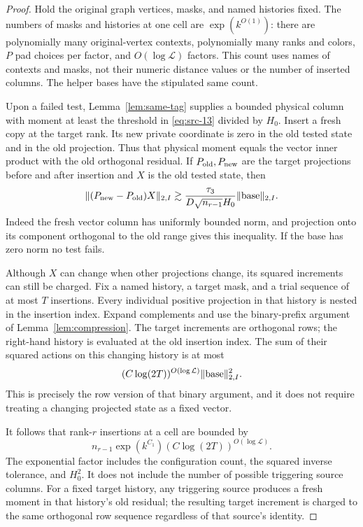 \begin{proof}
Hold the original graph vertices, masks, and named histories fixed.
The numbers of masks and histories at one cell are
$\exp(k^{O(1)})$: there are polynomially many original-vertex contexts,
polynomially many ranks and colors, $P$ pad choices per factor, and
$O(\log\mathcal L)$ factors.  This count uses names of contexts and
masks, not their numeric distance values or the number of inserted
columns.  The helper bases have the stipulated same count.

Upon a failed test, Lemma~\ref{lem:same-tag} supplies a bounded physical
column with moment at least the threshold in \eqref{eq:src-13} divided
by $H_0$.  Insert a fresh copy at the target rank.  Its new private
coordinate is zero in the old tested state and in the old projection.
Thus that physical moment equals the vector inner product with the old
orthogonal residual.  If $P_{\rm old},P_{\rm new}$ are the target
projections before and after insertion and $X$ is the old tested state,
then
\[
 \lVert (P_{\rm new}-P_{\rm old})X\rVert_{2,I}
 \gtrsim \frac{\tau_3}{D\sqrt{n_{r-1}}H_0}
        \lVert \text{base}\rVert_{2,I}.
\]
Indeed the fresh vector column has uniformly bounded norm, and
projection onto its component orthogonal to the old range gives this
inequality.  If the base has zero norm no test fails.

Although $X$ can change when other projections change, its squared
increments can still be charged.  Fix a named history, a target mask,
and a trial sequence of at most $T$ insertions.  Every individual
positive projection in that history is nested in the insertion index.
Expand complements and use the binary-prefix argument of
Lemma~\ref{lem:compression}.  The target increments are orthogonal
rows; the right-hand history is evaluated at the old insertion index.
The sum of their squared actions on this changing history is at most
\[
 (C\log(2T))^{O(\log\mathcal L)}\lVert \text{base}\rVert_{2,I}^2.
\]
This is precisely the row version of that binary argument, and it does
not require treating a changing projected state as a fixed vector.

It follows that rank-$r$ insertions at a cell are bounded by
\[
 n_{r-1}\exp(k^{C_1})
             (C\log(2T))^{O(\log\mathcal L)}.
\]
The exponential factor includes the configuration count, the squared
inverse tolerance, and $H_0^2$.  It does not include the number of
possible triggering source columns.  For a fixed target history, any
triggering source produces a fresh moment in that history's old
residual; the resulting target increment is charged to the same
orthogonal row sequence regardless of that source's identity.


\end{proof}
